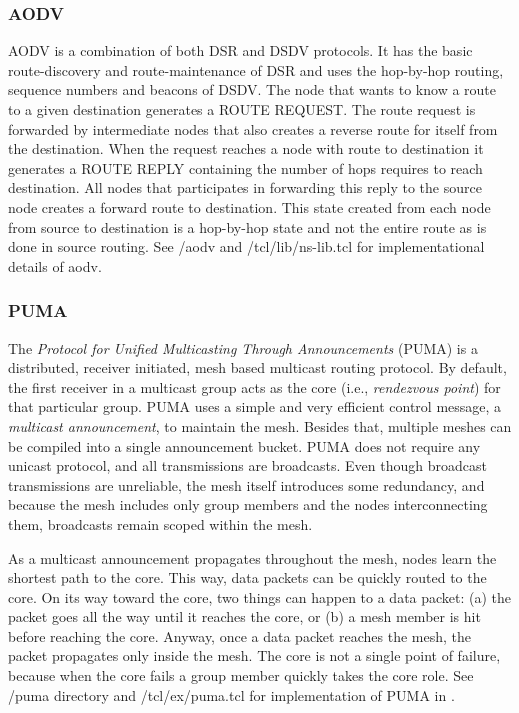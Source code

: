 \subsubsection{AODV}
\label{sec:AODV}

AODV is a combination of both DSR and DSDV protocols. It has the basic
route-discovery and route-maintenance of DSR and uses the hop-by-hop
routing, sequence numbers and beacons of DSDV. The node that wants to know
a route to a given destination generates a ROUTE REQUEST. The route
request is forwarded by intermediate nodes that also creates a reverse
route for itself from the destination. When the request reaches a node
with route to destination it generates a ROUTE REPLY containing the number
of hops requires to reach destination. All nodes that participates in
forwarding this reply to the source node creates a forward route to
destination. This state created from each node from source to destination
is a hop-by-hop state and not the entire route as is done in source
routing.
See \ns/aodv and \ns/tcl/lib/ns-lib.tcl for implementational details
of aodv.

\subsubsection{PUMA}
\label{sec:PUMA}

The \emph{Protocol for Unified Multicasting Through Announcements} (PUMA) 
is a distributed, receiver initiated, mesh based multicast routing protocol. 
By default, the first receiver in a multicast group acts as the core (i.e., 
\emph{rendezvous point}) for that particular group. PUMA uses a simple and 
very efficient control message, a \textit{multicast announcement}, to 
maintain the mesh. Besides that, multiple meshes can be compiled into a 
single announcement bucket. PUMA does not require any unicast protocol, and
all transmissions are broadcasts. Even though broadcast transmissions are 
unreliable, the mesh itself introduces some redundancy, and because the mesh
includes only group members and the nodes interconnecting them, broadcasts
remain scoped within the mesh.

As a multicast announcement propagates throughout the mesh, nodes learn the
shortest path to the core. This way, data packets can be quickly routed to 
the core. On its way toward the core, two things can happen to a data packet:
(a) the packet goes all the way until it reaches the core, or (b) a mesh 
member is hit before reaching the core. Anyway, once a data packet reaches 
the mesh, the packet propagates only inside the mesh. The core is not a 
single point of failure, because when the core fails a group member quickly 
takes the core role.
See \ns/puma directory and \ns/tcl/ex/puma.tcl for implementation of
PUMA in \ns.


